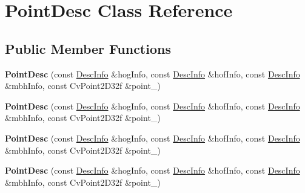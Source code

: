 \hypertarget{class_point_desc}{
\section{PointDesc Class Reference}
\label{class_point_desc}
}
\subsection*{Public Member Functions}
\begin{DoxyCompactItemize}
\item 
\hypertarget{class_point_desc_a51600c64989a85e072c1fea746c6d574}{
{\bfseries PointDesc} (const \hyperlink{struct_desc_info}{DescInfo} \&hogInfo, const \hyperlink{struct_desc_info}{DescInfo} \&hofInfo, const \hyperlink{struct_desc_info}{DescInfo} \&mbhInfo, const CvPoint2D32f \&point\_\-)}
\label{class_point_desc_a51600c64989a85e072c1fea746c6d574}

\item 
\hypertarget{class_point_desc_a51600c64989a85e072c1fea746c6d574}{
{\bfseries PointDesc} (const \hyperlink{struct_desc_info}{DescInfo} \&hogInfo, const \hyperlink{struct_desc_info}{DescInfo} \&hofInfo, const \hyperlink{struct_desc_info}{DescInfo} \&mbhInfo, const CvPoint2D32f \&point\_\-)}
\label{class_point_desc_a51600c64989a85e072c1fea746c6d574}

\item 
\hypertarget{class_point_desc_a51600c64989a85e072c1fea746c6d574}{
{\bfseries PointDesc} (const \hyperlink{struct_desc_info}{DescInfo} \&hogInfo, const \hyperlink{struct_desc_info}{DescInfo} \&hofInfo, const \hyperlink{struct_desc_info}{DescInfo} \&mbhInfo, const CvPoint2D32f \&point\_\-)}
\label{class_point_desc_a51600c64989a85e072c1fea746c6d574}

\item 
\hypertarget{class_point_desc_a51600c64989a85e072c1fea746c6d574}{
{\bfseries PointDesc} (const \hyperlink{struct_desc_info}{DescInfo} \&hogInfo, const \hyperlink{struct_desc_info}{DescInfo} \&hofInfo, const \hyperlink{struct_desc_info}{DescInfo} \&mbhInfo, const CvPoint2D32f \&point\_\-)}
\label{class_point_desc_a51600c64989a85e072c1fea746c6d574}

\end{DoxyCompactItemize}
